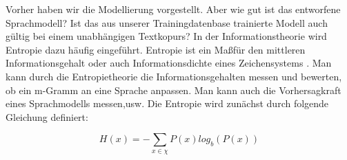 Vorher haben wir die Modellierung vorgestellt. Aber wie gut ist das entworfene Sprachmodell? Ist das aus unserer Trainingdatenbase trainierte Modell auch g\"ultig bei einem unabh\"angigen Textkopurs? In der Informationstheorie wird Entropie dazu h\"aufig eingef\"uhrt.
Entropie ist ein Ma\ss f\"ur den mittleren Informationsgehalt oder auch Informationsdichte eines Zeichensystems \cite{int_entropie}. Man kann durch die Entropietheorie die Informationsgehalten messen und bewerten, ob ein m-Gramm an eine Sprache anpassen. Man kann auch die Vorhersagkraft eines Sprachmodells messen,usw.\cite{book_speech}
Die Entropie wird zun\"achst durch folgende Gleichung definiert:

\begin{equation}
\label{equation:bewertung_01}
H(x)=-\sum_{x\in\chi}P(x)log_{b}(P(x))
\end{equation}

